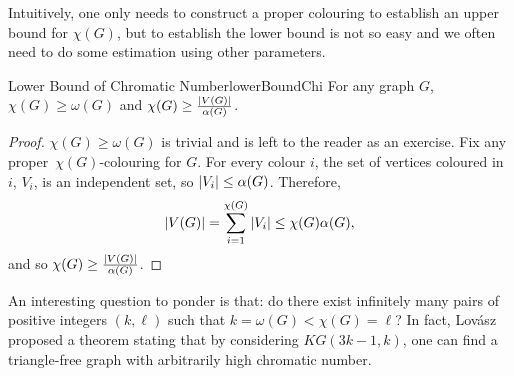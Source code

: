 \documentclass[math]{amznotes}
\theoremstyle{remark}
\begin{document}
Intuitively, one only needs to construct a proper colouring to establish an upper bound for $\chi(G)$, but to establish the lower bound is not so easy and we often need to do some estimation using other parameters.
\begin{probox}{Lower Bound of Chromatic Number}{lowerBoundChi}
    For any graph $G$, $\chi(G) \geq \omega(G)$ and $\chi(G) \geq \frac{{\left\lvert {V(G)} \right\rvert}}{\alpha(G)}$.
    \tcblower
    \begin{proof}
        $\chi(G) \geq \omega(G)$ is trivial and is left to the reader as an exercise. Fix any proper~$\chi(G)$-colouring for $G$. For every colour $i$, the set of vertices coloured in $i$, $V_i$, is an independent set, so ${\left\lvert {V_i} \right\rvert} \leq \alpha(G)$. Therefore,
        \begin{equation*}
            {\left\lvert {V(G)} \right\rvert} = \sum_{i = 1}^{\chi(G)}{\left\lvert {V_i} \right\rvert} \leq \chi(G)\alpha(G),
        \end{equation*}
        and so $\chi(G) \geq \frac{{\left\lvert {V(G)} \right\rvert}}{\alpha(G)}$.
    \end{proof}
\end{probox}
An interesting question to ponder is that: do there exist infinitely many pairs of positive integers $(k, \ell)$ such that $k = \omega(G) < \chi(G) = \ell$? In fact, Lov\'{a}sz proposed a theorem stating that by considering $KG(3k - 1, k)$, one can find a triangle-free graph with arbitrarily high chromatic number.
\end{document}
